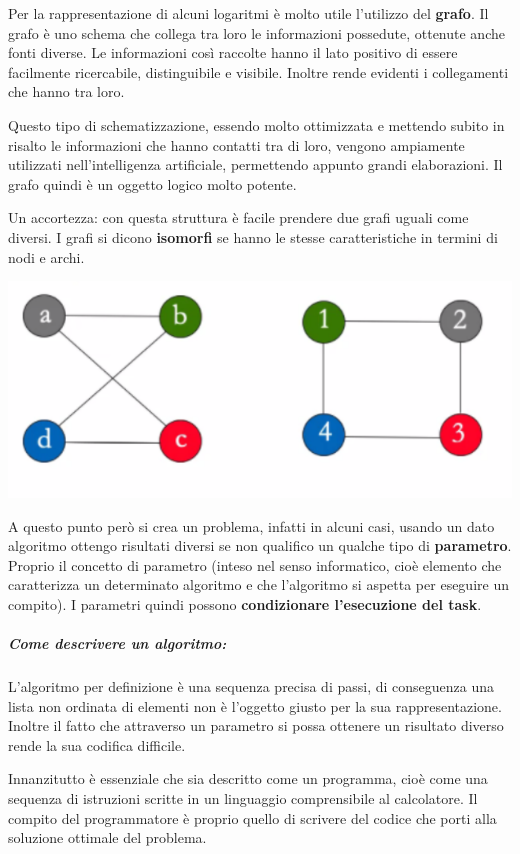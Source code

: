 \documentclass[
  paper=a4,
  oneside  ,captions=tableheading
]{scrbook}
\begin{document}
Per la rappresentazione di alcuni logaritmi è molto utile l'utilizzo del
\textbf{grafo}. Il grafo è uno schema che collega tra loro le
informazioni possedute, ottenute anche fonti diverse. Le informazioni
così raccolte hanno il lato positivo di essere facilmente ricercabile,
distinguibile e visibile. Inoltre rende evidenti i collegamenti che
hanno tra loro.

Questo tipo di schematizzazione, essendo molto ottimizzata e mettendo
subito in risalto le informazioni che hanno contatti tra di loro,
vengono ampiamente utilizzati nell'intelligenza artificiale, permettendo
appunto grandi elaborazioni. Il grafo quindi è un oggetto logico molto
potente.

Un accortezza: con questa struttura è facile prendere due grafi uguali
come diversi. I grafi si dicono \textbf{isomorfi} se hanno le stesse
caratteristiche in termini di nodi e archi.

\includegraphics{./image/image-20201110233258123.png}

A questo punto però si crea un problema, infatti in alcuni casi, usando
un dato algoritmo ottengo risultati diversi se non qualifico un qualche
tipo di \textbf{parametro}. Proprio il concetto di parametro (inteso nel
senso informatico, cioè elemento che caratterizza un determinato
algoritmo e che l'algoritmo si aspetta per eseguire un compito). I
parametri quindi possono \textbf{condizionare l'esecuzione del task}.

\hypertarget{come-descrivere-un-algoritmo}{%
\subparagraph{Come descrivere un
algoritmo:}\label{come-descrivere-un-algoritmo}}

L'algoritmo per definizione è una sequenza precisa di passi, di
conseguenza una lista non ordinata di elementi non è l'oggetto giusto
per la sua rappresentazione. Inoltre il fatto che attraverso un
parametro si possa ottenere un risultato diverso rende la sua codifica
difficile.

Innanzitutto è essenziale che sia descritto come un programma, cioè come
una sequenza di istruzioni scritte in un linguaggio comprensibile al
calcolatore. Il compito del programmatore è proprio quello di scrivere
del codice che porti alla soluzione ottimale del problema.
\end{document}
